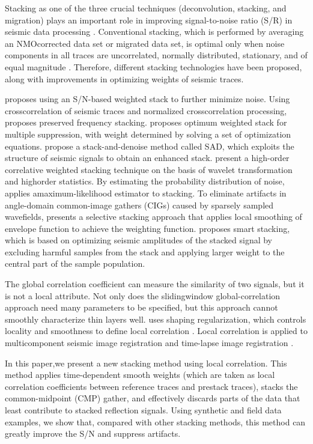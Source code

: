 Stacking as one of the three crucial techniques (deconvolution,
stacking, and migration) plays an important role in improving 
signal-to-noise ratio (S/R) in seismic data processing \cite[]{Yilmaz01}.
Conventional stacking, which is performed by averaging an NMOcorrected
data set or migrated data set, is optimal only when noise
components in all traces are uncorrelated, normally distributed, stationary,
and of equal magnitude \cite[]{Mayne62,Neelamani06}. Therefore, different 
stacking technologies have been proposed,
along with improvements in optimizing weights of seismic
traces.

\cite{Robinson70} proposes using an S/N-based weighted stack to
further minimize noise. Using crosscorrelation of seismic traces and
normalized crosscorrelation processing, \cite{Chang96} proposes
preserved frequency stacking. \cite{Schoenberger96} proposes optimum
weighted stack for multiple suppression, with weight determined
by solving a set of optimization equations. \cite{Neelamani06} 
propose a stack-and-denoise method called SAD, which exploits
the structure of seismic signals to obtain an enhanced stack.
\cite{Zhang06} present a high-order correlative weighted
stacking technique on the basis of wavelet transformation and highorder
statistics. By estimating the probability distribution of noise,
\cite{Trickett07} applies amaximum-likelihood estimator to stacking.
To eliminate artifacts in angle-domain common-image gathers
(CIGs) caused by sparsely sampled wavefields, \cite{Tang07} presents
a selective stacking approach that applies local smoothing of
envelope function to achieve the weighting function. \cite{Rashed08}
proposes smart stacking, which is based on optimizing seismic amplitudes
of the stacked signal by excluding harmful samples from the
stack and applying larger weight to the central part of the sample
population.

The global correlation coefficient can measure the similarity of
two signals, but it is not a local attribute. Not only does the slidingwindow
global-correlation approach need many parameters to be
specified, but this approach cannot smoothly characterize thin layers
well. \cite{Fomel07a} uses shaping regularization, which controls locality
and smoothness to define local correlation \cite[]{Fomel07b}.
Local correlation is applied to multicomponent seismic image registration
\cite[]{Fomel05,Fomel07b} and time-lapse image registration
\cite[]{Fomel07}.

In this paper,we present a new stacking method using local correlation.
This method applies time-dependent smooth weights (which
are taken as local correlation coefficients between reference traces
and prestack traces), stacks the common-midpoint (CMP) gather,
and effectively discards parts of the data that least contribute to
stacked reflection signals. Using synthetic and field data examples,
we show that, compared with other stacking methods, this method
can greatly improve the S/N and suppress artifacts.


